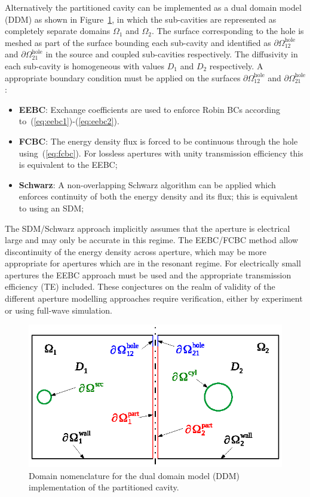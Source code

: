 \documentclass[a4paper]{article}
\numberwithin{equation}{section}
\newcounter{Figure}
\begin{document}
Alternatively the partitioned cavity can be implemented as a dual domain model (DDM) as shown in
Figure~\ref{fg:ddm}, in which the sub-cavities are represented as completely separate domains 
$\Omega_1$ and $\Omega_2$. The surface corresponding to the hole is meshed as part of the surface
bounding each sub-cavity and identified as $\partial\Omega^\mathrm{hole}_{12}$ and $\partial\Omega^\mathrm{hole}_{21}$ in 
the source and coupled sub-cavities respectively. The diffusivity in each sub-cavity is homogeneous
with values $D_1$ and $D_2$ respectively. A appropriate boundary condition must be applied on the 
surfaces $\partial\Omega^\mathrm{hole}_{12}$ and $\partial\Omega^\mathrm{hole}_{21}$:
\begin{itemize}
 \item \textbf{EEBC}: Exchange coefficients are used to enforce Robin BCs according to~(\ref{eq:eebc1})-(\ref{eq:eebc2}).
 \item \textbf{FCBC}: The energy density flux is forced to be continuous through the hole using~(\ref{eq:fcbc}). For lossless apertures
 with unity transmission efficiency this is equivalent to the EEBC; 
 \item \textbf{Schwarz}: A non-overlapping Schwarz algorithm can be applied which enforces continuity of both
 the energy density and its flux; this is equivalent to using an SDM;
\end{itemize}
The SDM/Schwarz approach implicitly assumes that the aperture is electrical large and may only be accurate in this
regime. The EEBC/FCBC method allow discontinuity of the energy density across aperture, which may be more appropriate 
for apertures which are in the resonant regime. For electrically small apertures the EEBC approach must be used and the 
appropriate transmission efficiency (TE) included. These conjectures on the realm of validity of the different aperture modelling approaches
require verification, either by experiment or using full-wave simulation.

\begin{figure}[ht]
\begin{center}
\includegraphics[width=0.6\linewidth]{figures/domains2}
\vspace{-4mm}
\caption{\label{fg:ddm} Domain nomenclature for the dual domain model (DDM) implementation of the partitioned cavity.}
\end{center}
\end{figure}
\end{document}
